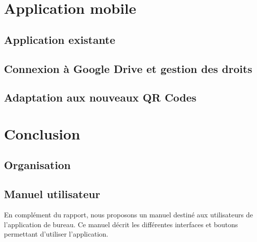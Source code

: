 \documentclass{report}
\begin{document}
\chapter{Application mobile}

	\section{Application existante}
		
		
	\section{Connexion à Google Drive et gestion des droits}
		

	\section{Adaptation aux nouveaux QR Codes}
		

\chapter{Conclusion}
	



\addappheadtotoc
\appendixpage

\appendix

\section{Organisation}

	
				

\section{Manuel utilisateur}
\par En complément du rapport, nous proposons un manuel destiné aux utilisateurs de l'application de bureau. Ce manuel décrit les différentes interfaces et boutons permettant d'utiliser l'application.

	
\end{document}
